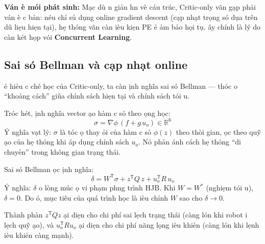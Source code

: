 \documentclass[12pt,a4paper]{article}
\newcommand{\R}{\mathbb{R}}
\newcommand{\T}{\mathsf{T}}
\begin{document}
\textbf{V\'{a}n \dj\`{e} m\'{o}i ph\'{a}t sinh:} M\d{a}c d\`{u} \dj\ohorn{}n gi\h{a}n h\ohorn{}n v\`{e} c\'{a}u tr\'{u}c, Critic-only v\~{a}n g\d{a}p ph\h{a}i v\'{a}n \dj\`{e} c\ohorn{} b\h{a}n: n\'{e}u ch\h{i} s\h{u} d\d{u}ng online gradient descent (c\d{a}p nh\d{a}t tr\d{o}ng s\'{o} d\d{u}a tr\^{e}n d\~{u} li\d{e}u hi\d{e}n t\d{a}i), h\d{e} th\'{o}ng v\~{a}n c\`{a}n \dj i\`{e}u ki\d{e}n PE \dj\h{e} \dj\h{a}m b\h{a}o h\d{o}i t\d{u}. \DJ\^{a}y ch\'{i}nh l\`{a} l\'{y} do c\`{a}n k\'{e}t h\d{o}p v\'{o}i \textbf{Concurrent Learning}.

\subsection{Sai s\'{o} Bellman v\`{a} c\d{a}p nh\d{a}t online}

\DJ\h{e} hi\h{e}u c\ohorn{} ch\'{e} h\d{o}c c\h{u}a Critic-only, ta c\`{a}n \dj\d{i}nh ngh\~{i}a sai s\'{o} Bellman --- th\uhorn{}\'{o}c \dj o ``kho\h{a}ng c\'{a}ch'' gi\~{u}a ch\'{i}nh s\'{a}ch hi\d{e}n t\d{a}i v\`{a} ch\'{i}nh s\'{a}ch t\'{o}i \uhorn{}u.

Tr\uhorn{}\'{o}c h\'{e}t, \dj\d{i}nh ngh\~{i}a vector \dj\d{a}o h\`{a}m c\ohorn{} s\h{o} theo \dj\d{o}ng h\d{o}c:
\begin{equation}
    \sigma = \nabla\phi\,(f + g\, u_o) \in \R^6
\end{equation}
\'{Y} ngh\~{i}a v\d{a}t l\'{y}: $\sigma$ l\`{a} t\'{o}c \dj\d{o} thay \dj\h{o}i c\h{u}a h\`{a}m c\ohorn{} s\h{o} $\phi(z)$ theo th\`{o}i gian, \dj\d{o}c theo qu\~{y} \dj\d{a}o c\h{u}a h\d{e} th\'{o}ng khi \'{a}p d\d{u}ng ch\'{i}nh s\'{a}ch $u_o$. N\'{o} ph\h{a}n \'{a}nh c\'{a}ch h\d{e} th\'{o}ng ``di chuy\h{e}n'' trong kh\^{o}ng gian tr\d{a}ng th\'{a}i.

Sai s\'{o} Bellman \dj\uhorn{}\d{o}c \dj\d{i}nh ngh\~{i}a:
\begin{equation}\label{eq:bellman}
    \delta = W^\T \sigma + z^\T Q\, z + u_o^\T R\, u_o
\end{equation}
\'{Y} ngh\~{i}a: $\delta$ \dj o l\uhorn{}\`{o}ng m\'{u}c \dj\d{o} vi ph\d{a}m ph\uhorn{}\ohorn{}ng tr\`{i}nh HJB. Khi $W = W^*$ (nghi\d{e}m t\'{o}i \uhorn{}u), $\delta = 0$. Do \dj\'{o}, m\d{u}c ti\^{e}u c\h{u}a qu\'{a} tr\`{i}nh h\d{o}c l\`{a} \dj i\`{e}u ch\h{i}nh $W$ sao cho $\delta \to 0$.

Th\`{a}nh ph\`{a}n $z^\T Q z$ \dj\d{a}i di\d{e}n cho chi ph\'{i} sai l\d{e}ch tr\d{a}ng th\'{a}i (c\`{a}ng l\'{o}n khi robot \dj i l\d{e}ch qu\~{y} \dj\d{a}o), v\`{a} $u_o^\T R u_o$ \dj\d{a}i di\d{e}n cho chi ph\'{i} n\u{a}ng l\uhorn{}\d{o}ng \dj i\`{e}u khi\h{e}n (c\`{a}ng l\'{o}n khi l\d{e}nh \dj i\`{e}u khi\h{e}n c\`{a}ng m\d{a}nh).
\end{document}
